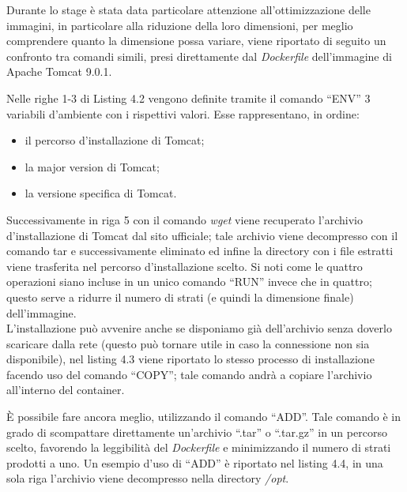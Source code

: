 Durante lo stage è stata data particolare attenzione all'ottimizzazione delle immagini, in particolare alla riduzione della loro dimensioni, per meglio comprendere quanto la dimensione possa variare, viene riportato di seguito un confronto tra comandi simili, presi direttamente dal \textit{Dockerfile} dell'immagine di Apache Tomcat 9.0.1.

  

Nelle righe 1-3 di Listing 4.2 vengono definite tramite il comando ``ENV'' 3 variabili d'ambiente con i rispettivi valori. Esse rappresentano, in ordine:
\begin{itemize}
    \item il percorso d'installazione di Tomcat;
    \item la major version di Tomcat;
    \item la versione specifica di Tomcat.
\end{itemize} 
Successivamente in riga 5 con il comando \textit{wget} viene recuperato l'archivio d'installazione di Tomcat dal sito ufficiale; tale archivio viene decompresso con il comando tar e successivamente eliminato ed infine la directory con i file estratti viene trasferita nel percorso d'installazione scelto. Si noti come le quattro operazioni siano incluse in un unico comando ``RUN'' invece che in quattro; questo serve a ridurre il numero di strati (e quindi la dimensione finale) dell'immagine.\\

L'installazione può avvenire anche se disponiamo già dell'archivio senza doverlo scaricare dalla rete (questo può tornare utile in caso la connessione non sia disponibile), nel listing 4.3 viene riportato lo stesso processo di installazione facendo uso del comando ``COPY''; tale comando andrà a copiare l'archivio all'interno del container.

  

\`E possibile fare ancora meglio, utilizzando il comando ``ADD''. Tale comando è in grado di scompattare direttamente un'archivio ``.tar'' o ``.tar.gz'' in un percorso scelto, favorendo la leggibilità del \textit{Dockerfile} e minimizzando il numero di strati prodotti a uno. Un esempio d'uso di ``ADD'' è riportato nel listing 4.4, in una sola riga l'archivio viene decompresso nella directory \textit{/opt}.

